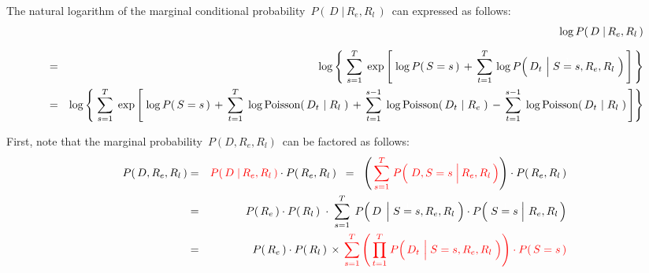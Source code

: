 \vskip 0.5cm
\begin{proposition}
\mbox{}
\vskip 0.2cm
\noindent
The natural logarithm of the marginal conditional probability
\,$P\!\left(\,D\;\vert\,R_{e},R_{l}\,\right)$\,
can expressed as follows:
\begin{eqnarray*}
&&
	\underset{{\color{white}}}{\log P\!\left(\,D \;\vert\, R_{e},R_{l}\,\right)}
\\
&=&
	\log\left\{\;
	\overset{T}{\underset{s=1}{\sum}}\;
	\exp\left[\;
		\log P\!\left(\,S=s\,\right)
		\, + \,
		\overset{T}{\underset{t=1}{\sum}}\,
		\log P\!\left(\,D_{t} \,\left\vert\; S\overset{{\color{white}1}}{=}s,R_{e},R_{l}\right.\,\right)
		\,\right]
	\,\right\}
\\
&=&
	\log\left\{\;
	\overset{T}{\underset{s=1}{\sum}}\;
	\exp\left[\;
			\log P\!\left(\,S=s\,\right)
			\,+\,
			\overset{T}{\underset{t=1}{\sum}}\;
			\log\textnormal{Poisson}\!\left(\,D_{t} \,\left\vert\; R_{l}\right.\,\right)
			\,+\,
			\overset{s-1}{\underset{t=1}{\sum}}\;
			\log\textnormal{Poisson}\!\left(\,D_{t} \,\left\vert\; R_{e}\right.\,\right)
			\,-\,
			\overset{s-1}{\underset{t=1}{\sum}}\;
			\log\textnormal{Poisson}\!\left(\,D_{t} \,\left\vert\; R_{l}\right.\,\right)
		\,\right]
	\right\}
\end{eqnarray*}
\end{proposition}
\proof
First, note that the marginal probability \,$P(D,R_{e},R_{l})$\, can be factored as follows:
\begin{eqnarray*}
P\!\left(\,D,R_{e},R_{l}\,\right)
&=&
	{\color{red}P\!\left(\,D \;\vert\, R_{e},R_{l}\,\right)}
	\cdot
	P\!\left(\,R_{e},R_{l}\,\right)
\;\; = \;\;
	\left(\,
		{\color{red}
		\overset{T}{\underset{s=1}{\sum}}\;
		P\!\left(\,\left.D,S\overset{{\color{white}1}}{=}s \;\right\vert R_{e},R_{l}\,\right)}
		\right)
	\cdot
	P\!\left(\,R_{e},R_{l}\,\right)
\\
& = &
	P\!\left(\,R_{e}\,\right)
	\cdot
	P\!\left(\,R_{l}\,\right)
	\;\cdot\;
	\overset{T}{\underset{s=1}{\sum}}\;\,
	P\!\left(\, D \;\left\vert\;S\overset{{\color{white}1}}{=}s,R_{e},R_{l} \right.\,\right)
	\cdot
	P\!\left(\,\left.S\overset{{\color{white}1}}{=}s\;\right\vert\,R_{e},R_{l}\,\right)
\\
& = &
	P\!\left(\,R_{e}\,\right)
	\cdot
	P\!\left(\,R_{l}\,\right)
	\,\times\,
	{\color{red}
	\overset{T}{\underset{s=1}{\sum}}
		\left(\,
			\overset{T}{\underset{t=1}{\prod}}\;
			P\!\left(\,D_{t} \,\left\vert\; S\overset{{\color{white}1}}{=}s,R_{e},R_{l}\right.\,\right)
			\right)
		\cdot
		P\!\left(\,S=s\,\right)
	}
\end{eqnarray*}
